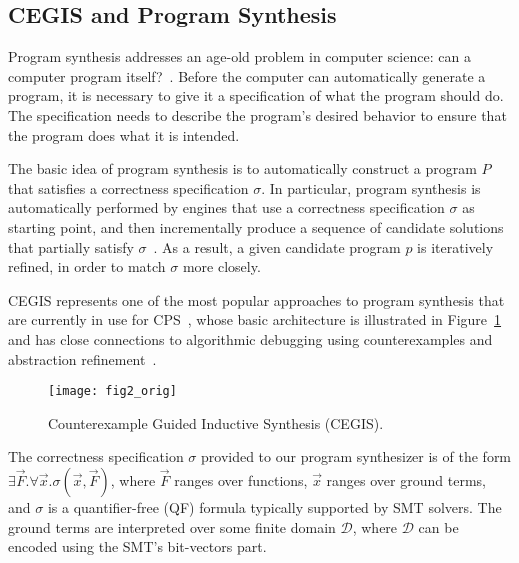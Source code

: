 \subsection{CEGIS and Program Synthesis}
\label{sec:ProgramSynthesis}

Program synthesis addresses an age-old problem in computer science: can a computer program itself?~\cite{Bornholt2019}. Before the computer can automatically generate a program, it is necessary to give it a specification of what the program should do. The specification needs to describe the program's desired behavior to ensure that the program does what it is intended.

The basic idea of program synthesis is to automatically construct a program $P$ that satisfies a correctness specification $\sigma$. In particular, program synthesis is automatically performed by engines that use a correctness specification $\sigma$ as starting point, and then incrementally produce a sequence of candidate solutions that partially satisfy $\sigma$~\cite{Abateetal2017}. As a result, a given candidate program $p$ is iteratively refined, in order to match $\sigma$ more closely. 

CEGIS represents one of the most popular approaches to program synthesis that are currently in use for CPS~\cite{Abateetal2017}, whose basic architecture is illustrated in Figure~\ref{Counter-Example-Guided-Inductive-Synthesis} and has close connections to algorithmic debugging using counterexamples and abstraction refinement~\cite{Alur}. 

\begin{figure}[h]
	\centering
	\texttt{[image: fig2\_orig]}
	\caption{Counterexample Guided Inductive Synthesis (CEGIS).}
	\label{Counter-Example-Guided-Inductive-Synthesis}
\end{figure}

The correctness specification $\sigma$ provided to our program synthesizer is of the form $\exists \vec{F} .  \forall \vec{x}.  \sigma(\vec{x}, \vec{F})$, where $\vec{F}$ ranges over functions, $\vec{x}$ ranges over ground terms, and $\sigma$ is a quantifier-free (QF) formula typically supported by SMT solvers. The ground terms are interpreted over some finite domain $\mathcal{D}$, where $\mathcal{D}$ can be encoded using the SMT's bit-vectors part. 

